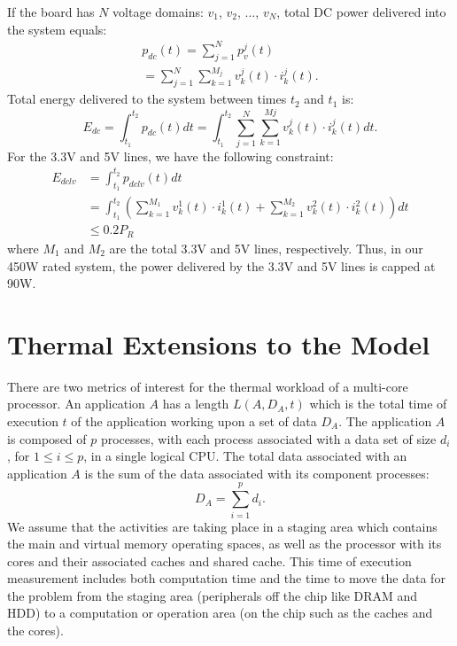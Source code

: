 If the board has $N$ voltage domains: $v_{1}$, $v_{2}$, $\ldots$, $v_{N}$,
total DC power delivered into the system equals:
\begin{align*}
\label{eq:power_vtot}
p_{dc}(t) = \sum_{j=1}^{N} p_{v}^{j}(t)\\
         =  \sum_{j=1}^{N} \sum_{k=1}^{M_{j}} v_{k}^{j}(t)\cdot i_{k}^{j}(t).
\end{align*}
Total energy delivered to the system between times $t_2$ and $t_1$ is:
\begin{equation*}
\label{eq:power_input}
E_{dc} = \int_{t_1}^{t_2} p_{dc}(t) dt  = \int_{t_1}^{t_2} \sum_{j=1}^{N} \sum_{k=1}^{Mj} v_{k}^{j}(t)\cdot i_{k}^{j}(t) dt.
\end{equation*}
\clearpage
For the 3.3V and 5V lines, we have the following constraint:
\begin{align*}
\label{eq:power_constr}
E_{dclv} &= \int_{t_1}^{t_2} p_{dclv} (t) dt \nonumber\\
        &=  \int_{t_1}^{t_2} \left( \sum_{k=1}^{M_{1}} v_{k}^{1}(t)\cdot i_{k}^{1}(t) +
        \sum_{k=1}^{M_{2}} v_{k}^{2}(t)\cdot i_{k}^{2}(t) \right) dt \nonumber\\
        & \leq 0.2 P_R
\end{align*}
where $M_{1}$ and $M_{2}$ are the total 3.3V and 5V lines, respectively.
Thus, in our 450W rated system, the power delivered by the 3.3V and 5V lines is capped at 90W.

\section{Thermal  Extensions to the Model}
\label{sec:themalmodel}
There are two metrics of interest for the thermal workload of a
multi-core processor. An application $A$ has a length $L(A,D_{A},t)$
which is the total time of execution $t$ of
the application working upon a set of data $D_{A}$. The
application $A$ is composed of $p$ processes, with each process
associated with a data set of size $d_i$, for $1\leq i \leq p$, in a
single logical CPU. The total data associated with an application $A$ is
the sum of the data associated with its component processes:
\begin{equation}
\label{eq:totaldata}
D_{A}=\displaystyle\sum_{i=1}^p{d_i}.
\end{equation}
We assume that the activities are taking place in a staging area which
contains the main and virtual memory operating spaces, as well as the
processor with its cores and their associated caches and shared cache.
This time of execution measurement includes both computation time and
the time to move the data for the problem from the staging area
(peripherals off the chip like DRAM and HDD) to a computation or
operation area (on the chip such as the caches and the cores).

